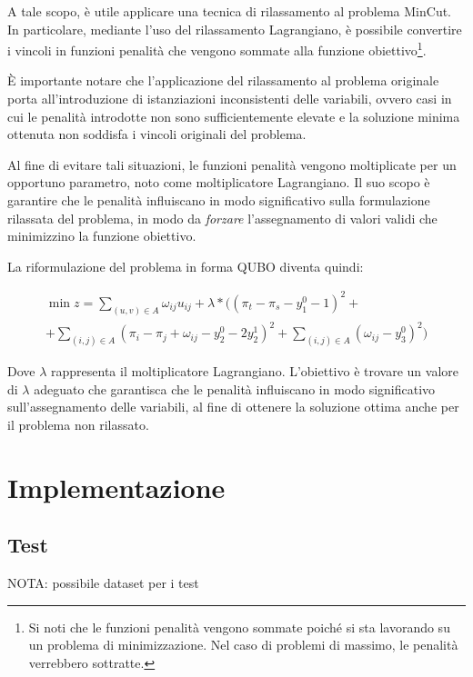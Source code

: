 \documentclass{article}
\begin{document}
A tale scopo, è utile applicare una tecnica di rilassamento al problema MinCut. In particolare, mediante l'uso del rilassamento Lagrangiano, è possibile convertire i vincoli in funzioni penalità che vengono sommate alla funzione obiettivo\footnote{Si noti che le funzioni penalità vengono sommate poiché si sta lavorando su un problema di minimizzazione. Nel caso di problemi di massimo, le penalità verrebbero sottratte.}.

È importante notare che l'applicazione del rilassamento al problema originale porta all'introduzione di istanziazioni inconsistenti delle variabili, ovvero casi in cui le penalità introdotte non sono sufficientemente elevate e la soluzione minima ottenuta non soddisfa i vincoli originali del problema.

Al fine di evitare tali situazioni, le funzioni penalità vengono moltiplicate per un opportuno parametro, noto come moltiplicatore Lagrangiano. Il suo scopo è garantire che le penalità influiscano in modo significativo sulla formulazione rilassata del problema, in modo da \emph{forzare} l'assegnamento di valori validi che minimizzino la funzione obiettivo.

La riformulazione del problema in forma QUBO diventa quindi:

\begin{center}
    \begin{multline*}
        \min z = \sum_{(u, v) \in A} \omega_{ij}u_{ij} + \lambda*((\pi_t - \pi_s - y_1^0 - 1)^2 +
        \\+ \sum_{(i, j) \in A}(\pi_i - \pi_j + \omega_{ij} - y_2^0 - 2y_2^1)^2 + \sum_{(i, j) \in A}(\omega_{ij} - y_3^0)^2)
    \end{multline*}    
\end{center}

Dove $\lambda$ rappresenta il moltiplicatore Lagrangiano. L'obiettivo è trovare un valore di $\lambda$ adeguato che garantisca che le penalità influiscano in modo significativo sull'assegnamento delle variabili, al fine di ottenere la soluzione ottima anche per il problema non rilassato.

\section{Implementazione}

\subsection{Test}
NOTA: possibile dataset per i test \cite{Jensen2022}




\end{document}
